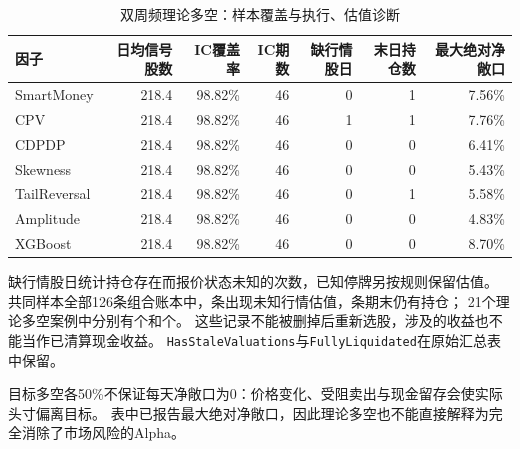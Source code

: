 \documentclass[UTF8,zihao=-4,fontset=fandol]{ctexart}
\begin{document}
\begin{table}[H]\centering\small
\caption{双周频理论多空：样本覆盖与执行、估值诊断}
\setlength{\tabcolsep}{4pt}
\begin{tabular}{lrrrrrr}\toprule
因子 & 日均信号股数 & IC覆盖率 & IC期数 & 缺行情股日 & 末日持仓数 & 最大绝对净敞口\\\midrule
SmartMoney & 218.4 & 98.82\% & 46 & 0 & 1 & 7.56\% \\
CPV & 218.4 & 98.82\% & 46 & 1 & 1 & 7.76\% \\
CDPDP & 218.4 & 98.82\% & 46 & 0 & 0 & 6.41\% \\
Skewness & 218.4 & 98.82\% & 46 & 0 & 0 & 5.43\% \\
TailReversal & 218.4 & 98.82\% & 46 & 0 & 1 & 5.58\% \\
Amplitude & 218.4 & 98.82\% & 46 & 0 & 0 & 4.83\% \\
XGBoost & 218.4 & 98.82\% & 46 & 0 & 0 & 8.70\% \\
\bottomrule
\end{tabular}\end{table}
缺行情股日统计持仓存在而报价状态未知的次数，已知停牌另按规则保留估值。
共同样本全部126条组合账本中，\OOSStaleSeries 条出现未知行情估值，\OOSUnclosedSeries 条期末仍有持仓；
21个理论多空案例中分别有\OOSLSStaleCases 个和\OOSLSUnclosedCases 个。
这些记录不能被删掉后重新选股，涉及的收益也不能当作已清算现金收益。
\texttt{HasStaleValuations}与\texttt{FullyLiquidated}在原始汇总表中保留。

目标多空各50\%不保证每天净敞口为0：价格变化、受阻卖出与现金留存会使实际头寸偏离目标。
表中已报告最大绝对净敞口，因此理论多空也不能直接解释为完全消除了市场风险的Alpha。

\clearpage
\end{document}
